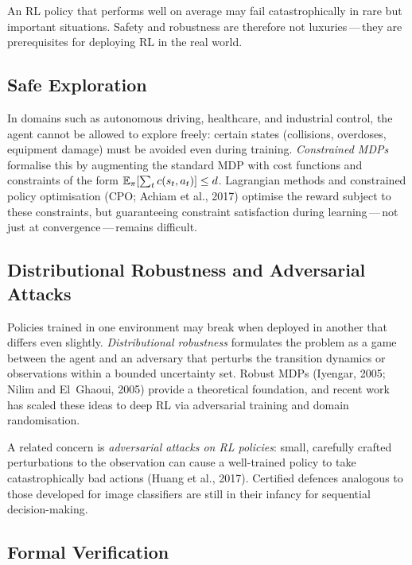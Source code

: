 An RL policy that performs well on average may fail catastrophically
in rare but important situations.  Safety and robustness are
therefore not luxuries\,---\,they are prerequisites for deploying RL
in the real world.

\subsection{Safe Exploration}

In domains such as autonomous driving, healthcare, and industrial
control, the agent cannot be allowed to explore freely: certain states
(collisions, overdoses, equipment damage) must be avoided even during
training.  \emph{Constrained MDPs} formalise
this by augmenting the standard MDP with cost functions and
constraints of the form $\operatorname{\mathbb{E}}_\pi[\sum_t c(s_t, a_t)] \leq d$.
Lagrangian methods and constrained policy optimisation (CPO;
Achiam et al., 2017) optimise the reward subject to these constraints,
but guaranteeing constraint satisfaction during learning\,---\,not
just at convergence\,---\,remains difficult.

\subsection{Distributional Robustness and Adversarial Attacks}

Policies trained in one environment may break when deployed in another
that differs even slightly.  \emph{Distributional robustness}
formulates the problem as a game between the agent and an adversary
that perturbs the transition dynamics or observations within a
bounded uncertainty set.  Robust MDPs (Iyengar, 2005; Nilim and
El~Ghaoui, 2005) provide a theoretical foundation, and recent work
has scaled these ideas to deep RL via adversarial training and
domain randomisation.

A related concern is \emph{adversarial attacks on RL policies}:
small, carefully crafted perturbations to the observation can cause a
well-trained policy to take catastrophically bad actions (Huang et
al., 2017).  Certified defences analogous to those developed for
image classifiers are still in their infancy for sequential
decision-making.

\subsection{Formal Verification}

